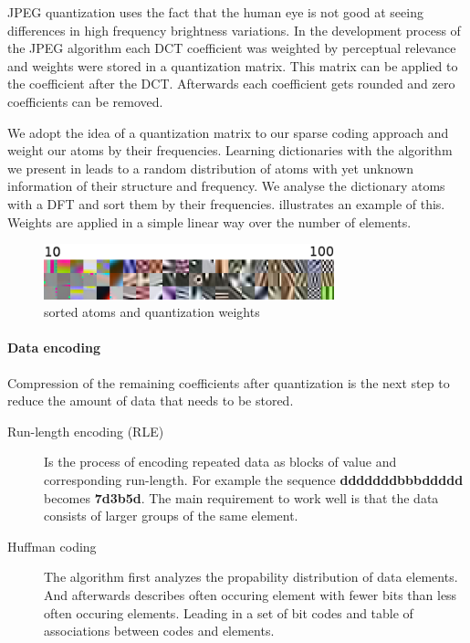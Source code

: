 JPEG quantization uses the fact that the human eye is not good at seeing
differences in high frequency brightness variations. In the development
process of the JPEG algorithm each DCT coefficient was weighted by perceptual
relevance and weights were stored in a quantization matrix. 
This matrix can be applied to the coefficient after the DCT. 
Afterwards each coefficient gets rounded and zero coefficients can be removed.

We adopt the idea of a quantization matrix to our sparse coding approach and
weight our atoms by their frequencies. Learning dictionaries with the
algorithm we present in  leads to a random distribution of
atoms with yet unknown information of their structure and frequency. We analyse
the dictionary atoms with a DFT and sort them by their frequencies.
 illustrates an example of this. Weights are applied
in a simple linear way over the number of elements.

\begin{figure}[h]
\centering
\includegraphics[width = 0.75\textwidth]{images/sorted.png}
\caption{sorted atoms and quantization weights}
\label{fig:sorted}
\end{figure}

\paragraph{Data encoding}
Compression of the remaining coefficients after quantization is the next step
to reduce the amount of data that needs to be stored.

\begin{description}
 \item[Run-length encoding (RLE)] Is the process of encoding repeated data as
blocks of value and corresponding run-length. 
For example the sequence {\bf dddddddbbbddddd} becomes {\bf7d3b5d}.
The main requirement to work well is that the data consists of larger groups of
the same element.
  \item[Huffman coding] The algorithm first analyzes the propability 
distribution of data elements. And afterwards describes often occuring element
with fewer bits than less often occuring elements. Leading in a set of
bit codes and table of associations between codes and elements. 
\end{description}

